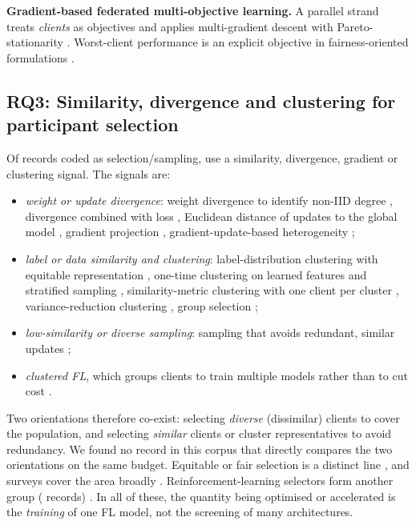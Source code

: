 \documentclass[11pt,a4paper]{article}
\begin{document}
\textbf{Gradient-based federated multi-objective learning.} A parallel strand treats \emph{clients} as objectives and applies multi-gradient descent with Pareto-stationarity \cite{askin2024federated,jiansheng2025federated,dehghanpour2026fedhv,guo2026fewformany}. Worst-client performance is an explicit objective in fairness-oriented formulations \cite{cui2021addressing}.

\subsection{RQ3: Similarity, divergence and clustering for participant selection}
Of \nseltotal{} records coded as selection/sampling, \nselsim{} use a similarity, divergence, gradient or clustering signal. The signals are:
\begin{itemize}
\item \emph{weight or update divergence}: weight divergence to identify non-IID degree \cite{zhang2021client}, divergence combined with loss \cite{guo2021wcl}, Euclidean distance of updates to the global model \cite{2025euclideanbased}, gradient projection \cite{na2025gpfl}, gradient-update-based heterogeneity \cite{balivada2026heterogeneityaware};
\item \emph{label or data similarity and clustering}: label-distribution clustering with equitable representation \cite{bhope2023flips,jimenezgutierrez2026fedlecc}, one-time clustering on learned features and stratified sampling \cite{abebe2023lefl}, similarity-metric clustering with one client per cluster \cite{fama2024measuring}, variance-reduction clustering \cite{shen2022fast}, group selection \cite{li2022data};
\item \emph{low-similarity or diverse sampling}: sampling that avoids redundant, similar updates \cite{kang2025lowsimilarity,liangyan2025pncspowernorm};
\item \emph{clustered FL}, which groups clients to train multiple models rather than to cut cost \cite{long2022multicenter,morafah2023flis,cheng2025snapcfl}.
\end{itemize}
Two orientations therefore co-exist: selecting \emph{diverse} (dissimilar) clients to cover the population, and selecting \emph{similar} clients or cluster representatives to avoid redundancy. We found no record in this corpus that directly compares the two orientations on the same budget. Equitable or fair selection is a distinct line \cite{jimenez2024submodular,arisdakessian2025towards,alsofyani2026a}, and surveys cover the area broadly \cite{smestad2023a,baker2025a,wijethilake2026federated,baduwal2026federated}. Reinforcement-learning selectors form another group (\nrlsel{} records) \cite{zhao2025fedppo}. In all of these, the quantity being optimised or accelerated is the \emph{training} of one FL model, not the screening of many architectures.
\end{document}
